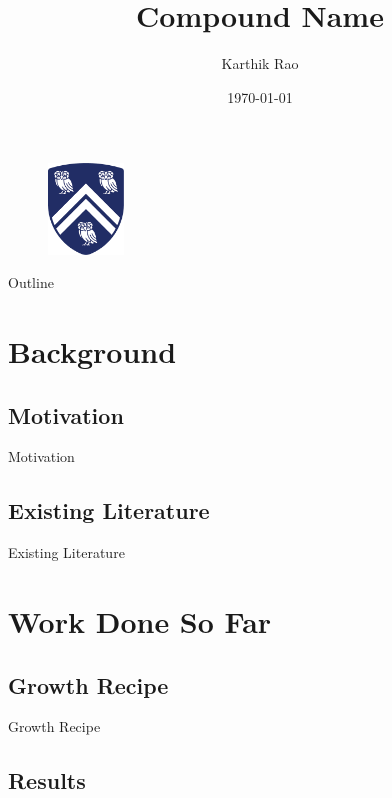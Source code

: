 \documentclass{beamer}
\title{Compound Name}
\author{Karthik Rao}
\institute{
  Department of Physics and Astronomy\\
  Rice University
 }
\date{\today}
\begin{document}
\begin{frame}[plain]

  \titlepage
\begin{figure}
    \includegraphics[width=2cm]{university-logo-filename.png}
\end{figure}

\end{frame}

\begin{frame}{Outline}
  \tableofcontents
\end{frame}
\section{Background}
\subsection{Motivation}

\begin{frame}{Motivation}

\end{frame}


\subsection{Existing Literature}

\begin{frame}{Existing Literature}
\end{frame}



\section{Work Done So Far}




\subsection{Growth Recipe}

\begin{frame}{Growth Recipe}
\end{frame}

\subsection{Results}
\end{document}
